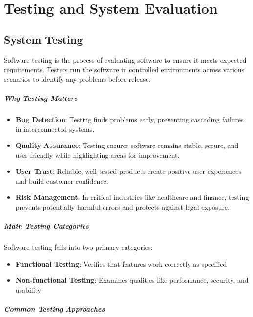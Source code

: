 \chapter{Testing and System Evaluation}
\section{System Testing}

Software testing \cite{katalon_software_testing} is the process of evaluating software to ensure it meets expected requirements. Testers run the software in controlled environments across various scenarios to identify any problems before release.

\paragraph{Why Testing Matters}

\begin{itemize}
    \item \textbf{Bug Detection}: Testing finds problems early, preventing cascading failures in interconnected systems.
    \item \textbf{Quality Assurance}: Testing ensures software remains stable, secure, and user-friendly while highlighting areas for improvement.
    \item \textbf{User Trust}: Reliable, well-tested products create positive user experiences and build customer confidence.
    \item \textbf{Risk Management}: In critical industries like healthcare and finance, testing prevents potentially harmful errors and protects against legal exposure.
\end{itemize}

\paragraph{Main Testing Categories}

Software testing falls into two primary categories:

\begin{itemize}
    \item \textbf{Functional Testing}: Verifies that features work correctly as specified
    \item \textbf{Non-functional Testing}: Examines qualities like performance, security, and usability
\end{itemize}

\paragraph{Common Testing Approaches}

